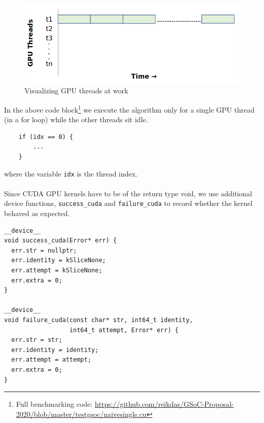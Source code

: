 \documentclass{article}
\begin{document}
\begin{figure}[H]
\includegraphics[width=\textwidth]{Graphics/naivesingle.PNG}
\caption{Visualizing GPU threads at work}
\end{figure}
\begin{mdframed}[backgroundcolor=light-gray, roundcorner=10pt,leftmargin=0.5, rightmargin=0.5, innertopmargin=1,innerbottommargin=1, outerlinewidth=1, linecolor=light-gray]

\end{mdframed}
In the above code block\footnote{Full benchmarking code: \url{https://github.com/reikdas/GSoC-Proposal-2020/blob/master/testgsoc/naivesingle.cu}} we execute the algorithm only for a single GPU thread (in a for loop) while the other threads sit idle.
\begin{mdframed}[backgroundcolor=light-gray, roundcorner=10pt,leftmargin=0.5, rightmargin=0.5, innertopmargin=1,innerbottommargin=1, outerlinewidth=1, linecolor=light-gray]
\begin{lstlisting}
    if (idx == 0) {
        ...
    }
\end{lstlisting}
\end{mdframed}
where the variable \texttt{idx} is the thread index.\\
\\
Since CUDA GPU kernels have to be of the return type void, we use additional device functions, \texttt{success_cuda} and \texttt{failure_cuda} to record whether the kernel behaved as expected.\\
\begin{mdframed}[backgroundcolor=light-gray, roundcorner=10pt,leftmargin=0.5, rightmargin=0.5, innertopmargin=1,innerbottommargin=1, outerlinewidth=1, linecolor=light-gray]
\begin{lstlisting}
__device__
void success_cuda(Error* err) {
  err.str = nullptr;
  err.identity = kSliceNone;
  err.attempt = kSliceNone;
  err.extra = 0;
}

__device__
void failure_cuda(const char* str, int64_t identity, 
                  int64_t attempt, Error* err) {
  err.str = str;
  err.identity = identity;
  err.attempt = attempt;
  err.extra = 0;
}
\end{lstlisting}
\end{mdframed}
\end{document}
